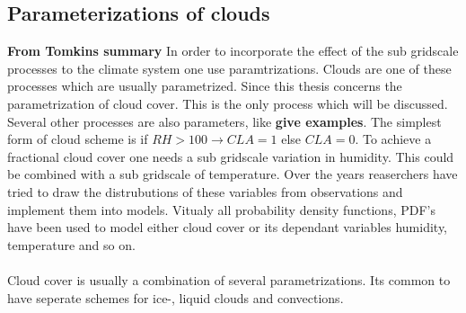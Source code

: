 \subsection{Parameterizations of clouds}
\textbf{From Tomkins summary}
In order to incorporate the effect of the sub gridscale processes to the climate system one use paramtrizations. Clouds are one of these processes which are usually parametrized. Since this thesis concerns the parametrization of cloud cover. This is the only process which will be discussed. Several other processes are also parameters, like \textbf{give examples}. The simplest form of cloud scheme is if $RH > 100 \rightarrow CLA = 1$ else $CLA = 0$. To achieve a fractional cloud cover one needs a sub gridscale variation in humidity. This could be combined with a sub gridscale of temperature. Over the years reaserchers have tried to draw the distrubutions of these variables from observations and implement them into models. Vitualy all probability density functions, PDF's have been used to model either cloud cover or its dependant variables humidity, temperature and so on.  
\\ \\
Cloud cover is usually a combination of several parametrizations. Its common to have seperate schemes for ice-, liquid clouds and convections.
\\ \\ 
